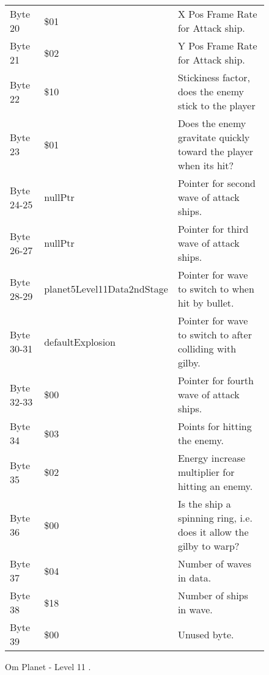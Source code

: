 \begin{figure}[H]
{\begin{adjustbox}{width=12cm}
\begin{tabular}{lll}
 Byte 20    & \$01                        & X Pos Frame Rate for Attack ship.                                   \\
 Byte 21    & \$02                        & Y Pos Frame Rate for Attack ship.                                   \\
 Byte 22    & \$10                        & Stickiness factor, does the enemy stick to the player               \\
 Byte 23    & \$01                        & Does the enemy gravitate quickly toward the player when its hit?    \\
 Byte 24-25 & nullPtr                    & Pointer for second wave of attack ships.                            \\
 Byte 26-27 & nullPtr                    & Pointer for third wave of attack ships.                             \\
 Byte 28-29 & planet5Level11Data2ndStage & Pointer for wave to switch to when hit by bullet.                   \\
 Byte 30-31 & defaultExplosion           & Pointer for  wave to switch to after colliding with gilby.          \\
 Byte 32-33 & \$00                        & Pointer for fourth wave of attack ships.                            \\
 Byte 34    & \$03                        & Points for hitting the enemy.                                       \\
 Byte 35    & \$02                        & Energy increase multiplier for hitting an enemy.                    \\
 Byte 36    & \$00                        & Is the ship a spinning ring, i.e. does it allow the gilby to warp?  \\
 Byte 37    & \$04                        & Number of waves in data.                                            \\
 Byte 38    & \$18                        & Number of ships in wave.                                            \\
 Byte 39    & \$00                        & Unused byte.                                                        \\
\bottomrule
\end{tabular}

  \end{adjustbox}

  }\caption*{Om Planet - Level 11
.}
\end{figure}

